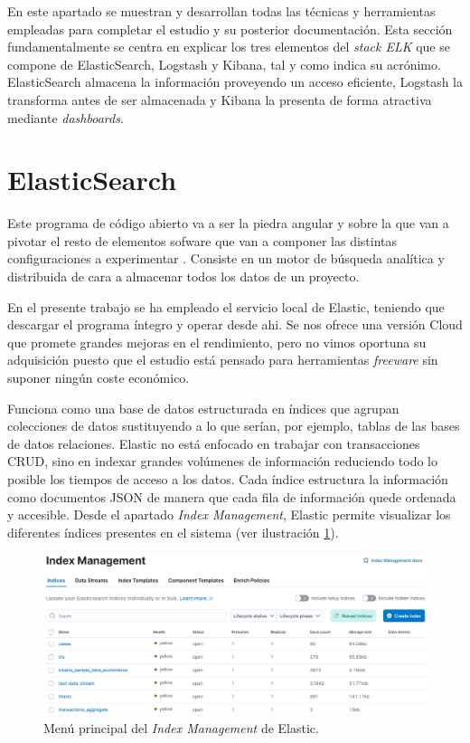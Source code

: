 
En este apartado se muestran y desarrollan todas las técnicas y herramientas empleadas para completar el estudio y su posterior documentación. Esta sección fundamentalmente se centra en explicar los tres elementos del \textit{stack ELK} que se compone de ElasticSearch, Logstash y Kibana, tal y como indica su acrónimo. ElasticSearch almacena la información proveyendo un acceso eficiente, Logstash la transforma antes de ser almacenada y Kibana la presenta de forma atractiva mediante \textit{dashboards}. 

\section{ElasticSearch}
Este programa de código abierto va a ser la piedra angular y sobre la que van a pivotar el resto de elementos sofware que van a componer las distintas configuraciones a experimentar . Consiste en un motor de búsqueda analítica y distribuida de cara a almacenar todos los datos de un proyecto. \cite{ElasticSearch}

En el presente trabajo se ha empleado el servicio local de Elastic, teniendo que descargar el programa íntegro y operar desde ahi. Se nos ofrece una versión Cloud que promete grandes mejoras en el rendimiento, pero no vimos oportuna su adquisición puesto que el estudio está pensado para herramientas \textit{freeware} sin suponer ningún coste económico.

Funciona como una base de datos estructurada en índices que agrupan colecciones de datos sustituyendo a lo que serían, por ejemplo, tablas de las bases de datos relaciones. Elastic no está enfocado en trabajar con transacciones CRUD, sino en indexar grandes volúmenes de información reduciendo todo lo posible los tiempos de acceso a los datos. Cada índice estructura la información como documentos JSON de manera que cada fila de información quede ordenada y accesible. Desde el apartado \textit{Index Management}, Elastic permite visualizar los diferentes índices presentes en el sistema  (ver ilustración   \ref{fig:indices}).

\begin{figure}
    \centering
    \includegraphics[width=1\linewidth]{img/management.png}
    \caption{Menú principal del \textit{Index Management} de Elastic.}
    \label{fig:indices}
\end{figure}

